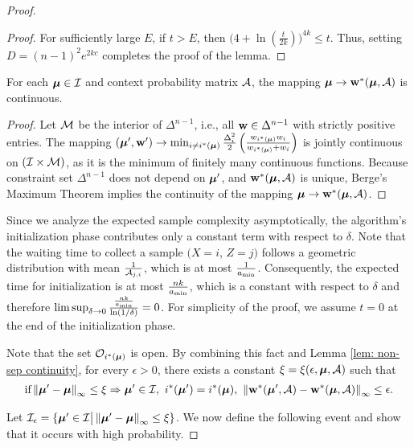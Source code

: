 \begin{proof}
\begin{proof}
    For sufficiently large \(E\), if $t > E$, then $\bigl(4 + \ln(\tfrac{t}{2k})\bigr)^{4k} \le t$. Thus, setting \(D = (n-1)^2 e^{2kc}\) completes the proof of the lemma.
    \end{proof}
    
    \begin{lemma} \label{lem: non-sep continuity}
        For each $\boldsymbol{\mu} \in \mathcal{I}$ and context probability matrix $\mathcal{A}$, the mapping $\boldsymbol{\mu} \rightarrow \mathbf{w}^*(\boldsymbol{\mu}, \mathcal{A})$ is continuous.
    \end{lemma}
    \begin{proof}
        Let $\mathcal{M}$ be the interior of $\Delta^{n -1}$, i.e., all $\mathbf{w} \in \Delta^{n-1}$ with strictly positive entries. The mapping $(\boldsymbol{\mu}', \mathbf{w}') \rightarrow \min_{i \neq i^*(\boldsymbol{\mu})} \frac{\Delta_{i}^2}{2}\left( \frac{w_{i^*(\boldsymbol{\mu})}w_i}{w_{i^*(\boldsymbol{\mu})} + w_i}\right) $ is jointly continuous on $(\mathcal{I} \times \mathcal{M})$, as it is the minimum of finitely many continuous functions.
        Because constraint set $\Delta^{n-1}$ does not depend on $\boldsymbol{\mu}'$, and $\mathbf{w}^*(\boldsymbol{\mu}, \mathcal{A})$ is unique, Berge's Maximum Theorem implies the continuity of the mapping $\boldsymbol{\mu} \rightarrow \mathbf{w}^*(\boldsymbol{\mu}, \mathcal{A})$.
    \end{proof}

    Since we analyze the expected sample complexity asymptotically, the algorithm’s initialization phase contributes only a constant term with respect to $\delta$.  Note that the waiting time to collect a sample $(X = i$, $Z = j)$ follows a geometric distribution with mean $\frac{1}{\mathcal{A}_{j,i}}$, which is at most $\frac{1}{a_{\min}}$. Consequently, the expected time for initialization is at most $\frac{nk}{a_{\min}}$, which is a constant with respect to $\delta$ and therefore $\limsup_{\delta \rightarrow 0} \frac{\frac{nk}{a_{\min}}}{\ln(1 / \delta)} = 0$. For simplicity of the proof, we assume $t=0$ at the end of the initialization phase.



    Note that the set $\mathcal{O}_{i^*(\boldsymbol{\mu})}$ is open. By combining this fact and Lemma \ref{lem: non-sep continuity}, for every $\epsilon > 0$, there exists a constant $\xi = \xi({\epsilon}, \boldsymbol{\mu}, \mathcal{A})$ such that
    \begin{align*}
        \text{if} \left\Vert \boldsymbol{\mu}' - \boldsymbol{\mu} \right\Vert _{\infty} \leq \xi \Rightarrow \boldsymbol{\mu}' \in \mathcal{I}, ~  i^*(\boldsymbol{\mu}') = i^*(\boldsymbol{\mu}), ~ \left\Vert \mathbf{w}^*(\boldsymbol{\mu}', \mathcal{A}) - \mathbf{w}^*(\boldsymbol{\mu}, \mathcal{A}) \right\Vert _{\infty} \leq \epsilon. 
    \end{align*}    

    Let $\mathcal{I}_{\epsilon} = \{ \boldsymbol{\mu}' \in \mathcal{I} \big| \left\Vert \boldsymbol{\mu}' - \boldsymbol{\mu} \right\Vert _{\infty} \leq \xi \}$. We now define the following event and show that it occurs with high probability.


\end{proof}

